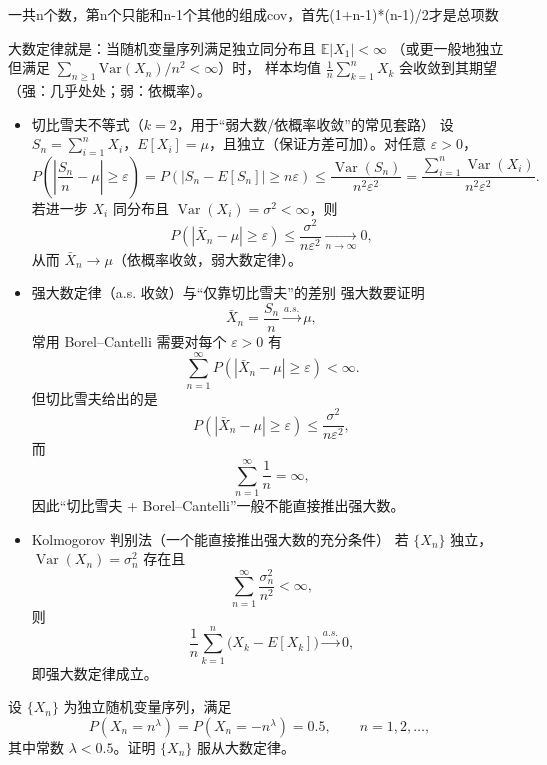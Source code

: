 \begin{dxtips}
    一共n个数，第n个只能和n-1个其他的组成cov，首先(1+n-1)*(n-1)/2才是总项数
\end{dxtips}
\begin{definition}
    大数定律就是：当随机变量序列满足独立同分布且 $\mathbb E|X_1|<\infty$
（或更一般地独立但满足 $\sum_{n\ge1}\mathrm{Var}(X_n)/n^2<\infty$）时，
样本均值 $\frac1n\sum_{k=1}^n X_k$ 会收敛到其期望
（强：几乎处处；弱：依概率）。
\end{definition}
\begin{dxtips}
    \begin{itemize}
  \item 切比雪夫不等式（$k=2$，用于“弱大数/依概率收敛”的常见套路）  
  设 $S_n=\sum_{i=1}^n X_i$，$E[X_i]=\mu$，且独立（保证方差可加）。对任意 $\varepsilon>0$，
  \[
  P\!\left(\left|\frac{S_n}{n}-\mu\right|\ge \varepsilon\right)
  =P\!\left(\left|S_n-E[S_n]\right|\ge n\varepsilon\right)
  \le \frac{\operatorname{Var}(S_n)}{n^2\varepsilon^2}
  =\frac{\sum_{i=1}^n \operatorname{Var}(X_i)}{n^2\varepsilon^2}.
  \]
  若进一步 $X_i$ 同分布且 $\operatorname{Var}(X_i)=\sigma^2<\infty$，则
  \[
  P\!\left(\left|\bar X_n-\mu\right|\ge \varepsilon\right)
  \le \frac{\sigma^2}{n\varepsilon^2}\xrightarrow[n\to\infty]{}0,
  \]
  从而 $\bar X_n\to \mu$（依概率收敛，弱大数定律）。

  \item 强大数定律（a.s. 收敛）与“仅靠切比雪夫”的差别  
  强大数要证明
  \[
  \bar X_n=\frac{S_n}{n}\xrightarrow{a.s.}\mu,
  \]
  常用 Borel--Cantelli 需要对每个 $\varepsilon>0$ 有
  \[
  \sum_{n=1}^\infty P\!\left(|\bar X_n-\mu|\ge \varepsilon\right)<\infty.
  \]
  但切比雪夫给出的是
  \[
  P\!\left(|\bar X_n-\mu|\ge \varepsilon\right)\le \frac{\sigma^2}{n\varepsilon^2},
  \]
  而
  \[
  \sum_{n=1}^\infty \frac{1}{n}=\infty,
  \]
  因此“切比雪夫 + Borel--Cantelli”一般不能直接推出强大数。

  \item Kolmogorov 判别法（一个能直接推出强大数的充分条件）  
  若 $\{X_n\}$ 独立，$\operatorname{Var}(X_n)=\sigma_n^2$ 存在且
  \[
  \sum_{n=1}^\infty \frac{\sigma_n^2}{n^2}<\infty,
  \]
  则
  \[
  \frac{1}{n}\sum_{k=1}^n \bigl(X_k-E[X_k]\bigr)\xrightarrow{a.s.}0,
  \]
  即强大数定律成立。
\end{itemize}
\end{dxtips}
\begin{homework}[5.4]
设 $\{X_n\}$ 为独立随机变量序列，满足
\[
P(X_n = n^\lambda) = P(X_n = -n^\lambda) = 0.5 , \qquad n=1,2,\ldots,
\]
其中常数 $\lambda<0.5$。证明 $\{X_n\}$ 服从大数定律。
\end{homework}
